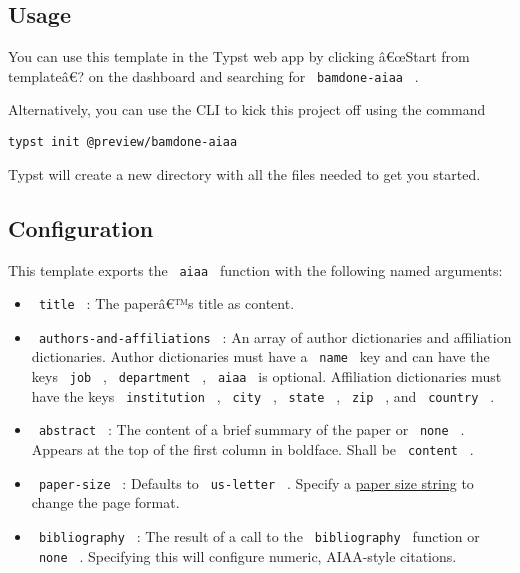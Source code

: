 \subsection{Usage}\label{usage}

You can use this template in the Typst web app by clicking â€œStart from
templateâ€? on the dashboard and searching for \texttt{\ bamdone-aiaa\ }
.

Alternatively, you can use the CLI to kick this project off using the
command

\begin{verbatim}
typst init @preview/bamdone-aiaa
\end{verbatim}

Typst will create a new directory with all the files needed to get you
started.

\subsection{Configuration}\label{configuration}

This template exports the \texttt{\ aiaa\ } function with the following
named arguments:

\begin{itemize}
\tightlist
\item
  \texttt{\ title\ } : The paperâ€™s title as content.
\item
  \texttt{\ authors-and-affiliations\ } : An array of author
  dictionaries and affiliation dictionaries. Author dictionaries must
  have a \texttt{\ name\ } key and can have the keys \texttt{\ job\ } ,
  \texttt{\ department\ } , \texttt{\ aiaa\ } is optional. Affiliation
  dictionaries must have the keys \texttt{\ institution\ } ,
  \texttt{\ city\ } , \texttt{\ state\ } , \texttt{\ zip\ } , and
  \texttt{\ country\ } .
\item
  \texttt{\ abstract\ } : The content of a brief summary of the paper or
  \texttt{\ none\ } . Appears at the top of the first column in
  boldface. Shall be \texttt{\ content\ } .
\item
  \texttt{\ paper-size\ } : Defaults to \texttt{\ us-letter\ } . Specify
  a
  \href{https://typst.app/docs/reference/layout/page/\#parameters-paper}{paper
  size string} to change the page format.
\item
  \texttt{\ bibliography\ } : The result of a call to the
  \texttt{\ bibliography\ } function or \texttt{\ none\ } . Specifying
  this will configure numeric, AIAA-style citations.
\end{itemize}

